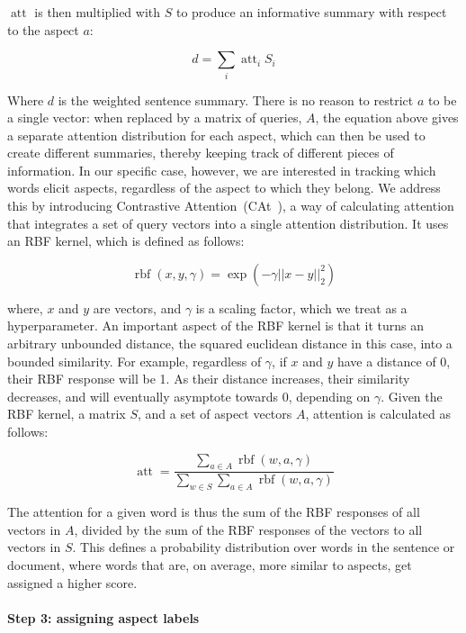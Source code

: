 \documentclass[11pt,a4paper]{article}
\newlength{\catheight}
\newcommand{\ourmodel}{CAt~\raisebox{-0.1ex}{\texttt{[image: fig/cat]}}} \definecolor{aspectcolor}{HTML}{fb7e5e}
\DeclareMathOperator{\rbf}{rbf}
\DeclareMathOperator{\att}{att}
\begin{document}
$\att$ is then multiplied with $S$ to produce an informative summary with respect to the aspect $a$:

\begin{equation}
    d = \sum_{i} \att_i S_i
\end{equation}

Where $d$ is the weighted sentence summary.
There is no reason to restrict $a$ to be a single vector: when replaced by a matrix of queries, $A$, the equation above gives a separate attention distribution for each aspect, which can then be used to create different summaries, thereby keeping track of different pieces of information.
In our specific case, however, we are interested in tracking which words elicit aspects, regardless of the aspect to which they belong.
We address this by introducing Contrastive Attention~(\ourmodel), a way of calculating attention that integrates a set of query vectors into a single attention distribution.
It uses an RBF kernel, which is defined as follows:

\begin{equation}
    \rbf(x, y, \gamma) = \exp(-\gamma ||x - y||^{2}_{2})
\end{equation}

where, $x$ and $y$ are vectors, and $\gamma$ is a scaling factor, which we treat as a hyperparameter.
An important aspect of the RBF kernel is that it turns an arbitrary unbounded distance, the squared euclidean distance in this case, into a bounded similarity. 
For example, regardless of $\gamma$, if $x$ and $y$ have a distance of 0, their RBF response will be 1. 
As their distance increases, their similarity decreases, and will eventually asymptote towards 0, depending on $\gamma$.
Given the RBF kernel, a matrix $S$, and a set of aspect vectors $A$, attention is calculated as follows:

\begin{equation}
\att = \frac{\sum_{a \in A} \rbf(w, a, \gamma)}{\sum_{w \in S} \sum_{a \in A} \rbf(w, a, \gamma)}
\end{equation}

The attention for a given word is thus the sum of the RBF responses of all vectors in $A$, divided by the sum of the RBF responses of the vectors to all vectors in $S$.
This defines a probability distribution over words in the sentence or document, where words that are, on average, more similar to aspects, get assigned a higher score.

\paragraph{Step 3: assigning aspect labels}
\end{document}
